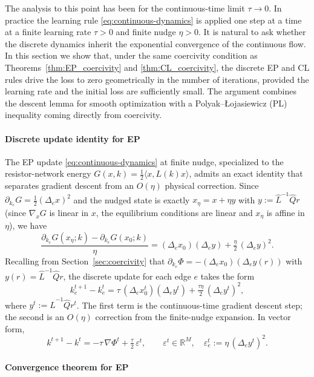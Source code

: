 \documentclass{siamart}
\begin{document}
The analysis to this point has been for the continuous-time limit $\tau \to 0$. In practice the learning rule \eqref{eq:continuous-dynamics} is applied one step at a time at a finite learning rate $\tau > 0$ and finite nudge $\eta > 0$. It is natural to ask whether the discrete dynamics inherit the exponential convergence of the continuous flow. In this section we show that, under the same coercivity condition as Theorems~\ref{thm:EP_coercivity} and \ref{thm:CL_coercivity}, the discrete EP and CL rules drive the loss to zero geometrically in the number of iterations, provided the learning rate and the initial loss are sufficiently small. The argument combines the descent lemma for smooth optimization with a Polyak--\L{}ojasiewicz (PL) inequality coming directly from coercivity.

\paragraph{Discrete update identity for EP}

The EP update \eqref{eq:continuous-dynamics} at finite nudge, specialized to the resistor-network energy $G(x,k) = \tfrac{1}{2}\langle x, L(k) x\rangle$, admits an exact identity that separates gradient descent from an $O(\eta)$ physical correction. Since $\partial_{k_e} G = \tfrac{1}{2}(\Delta_e x)^2$ and the nudged state is exactly $x_\eta = x + \eta y$ with $y := \hat{L}^{-1}\hat{Q}r$ (since $\nabla_x G$ is linear in $x$, the equilibrium conditions are linear and $x_\eta$ is affine in $\eta$), we have
\[
\frac{\partial_{k_e} G(x_\eta; k) - \partial_{k_e} G(x_0; k)}{\eta} = (\Delta_e x_0)(\Delta_e y) + \tfrac{\eta}{2}\,(\Delta_e y)^2.
\]
Recalling from Section~\ref{sec:coercivity} that $\partial_{k_e}\Phi = -(\Delta_e x_0)(\Delta_e y(r))$ with $y(r) = \hat{L}^{-1}\hat{Q}r$, the discrete update for each edge $e$ takes the form
\begin{equation}\label{eq:EP_discrete}
k_e^{t+1} - k_e^t = \tau\,(\Delta_e x_0^t)(\Delta_e y^t) + \tfrac{\tau\eta}{2}\,(\Delta_e y^t)^2,
\end{equation}
where $y^t := \hat{L}^{-1}\hat{Q}r^t$. The first term is the continuous-time gradient descent step; the second is an $O(\eta)$ correction from the finite-nudge expansion. In vector form,
\[
k^{t+1} - k^t = -\tau\,\nabla\Phi^t + \tfrac{\tau}{2}\,\varepsilon^t, \qquad \varepsilon^t \in \mathbb{R}^M, \quad \varepsilon^t_e := \eta\,(\Delta_e y^t)^2.
\]

\paragraph{Convergence theorem for EP}
\end{document}
